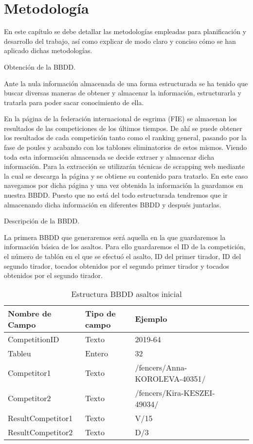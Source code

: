 \chapter{Metodología}
\label{cap:Metodologia}

En este capítulo se debe detallar las metodologías empleadas para planificación y desarrollo del trabajo,
así como explicar de modo claro y conciso cómo se han aplicado dichas metodologías.


Obtención de la BBDD.

Ante la nula información almacenada de una forma estructurada se ha tenido que buscar
 diversas maneras de obtener y almacenar la información, estructurarla y tratarla para
 poder sacar conocimiento de ella.

En la página de la federación internacional de esgrima (FIE) se almacenan los resultados
 de las competiciones de los últimos tiempos. De ahí se puede obtener los resultados
 de cada competición tanto como el ranking general, pasando por la fase de poules
 y acabando con los tablones eliminatorios de estos mismos. Viendo toda esta información
 almacenada se decide extraer y almacenar dicha información. Para la extracción se
 utilizarán técnicas de scrapping web mediante la cual se descarga la página y se
 obtiene su contenido para tratarlo. En este caso navegamos por dicha página y una
 vez obtenida la información la guardamos en nuestra BBDD. Puesto que no está del
 todo estructurada tendremos que ir almacenando dicha información en diferentes BBDD
 y después juntarlas.

Descripción de la BBDD.

La primera BBDD que generaremos será aquella en la que guardaremos la información
 básica de los asaltos. Para ello guardaremos el ID de la competición, el número
 de tablón en el que se efectuó el asalto, ID del primer tirador, ID del segundo
 tirador, tocados obtenidos por el segundo primer tirador y tocados obtenidos por
 el segundo tirador.

\begin{table}[htb]%
  \centering
  \caption{Estructura BBDD asaltos inicial}
  \label{tab:anchura}
  \begin{tabular}{ | l | l | l | l | l | l | }
    \hline
    Nombre de Campo & Tipo de campo & Ejemplo \\ \hline
    CompetitionID & Texto & 2019-64 \\ \hline
    Tableu & Entero & 32 \\ \hline
    Competitor1 & Texto & /fencers/Anna-KOROLEVA-40351/ \\ \hline
    Competitor2 & Texto & /fencers/Kira-KESZEI-49034/ \\ \hline
    ResultCompetitor1 & Texto & V/15 \\ \hline
    ResultCompetitor2 & Texto & D/3 \\
    \hline
  \end{tabular}
\end{table}

